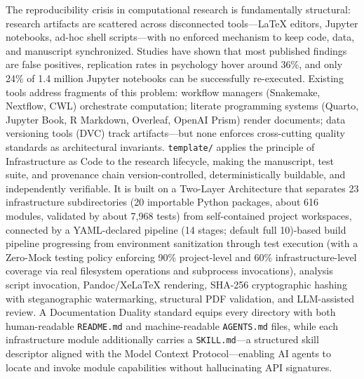 \documentclass[
]{article}
\newcounter{none} %
\begin{document}
The reproducibility crisis in computational research is fundamentally
structural: research artifacts are scattered across disconnected
tools---LaTeX editors, Jupyter notebooks, ad-hoc shell scripts---with no
enforced mechanism to keep code, data, and manuscript synchronized.
Studies have shown that most published findings are false positives,
replication rates in psychology hover around 36\%, and only 24\% of 1.4
million Jupyter notebooks can be successfully re-executed. Existing
tools address fragments of this problem: workflow managers (Snakemake,
Nextflow, CWL) orchestrate computation; literate programming systems
(Quarto, Jupyter Book, R Markdown, Overleaf, OpenAI Prism) render
documents; data versioning tools (DVC) track artifacts---but none
enforces cross-cutting quality standards as architectural invariants.
\texttt{template/} applies the principle of Infrastructure as Code to
the research lifecycle, making the manuscript, test suite, and
provenance chain version-controlled, deterministically buildable, and
independently verifiable. It is built on a Two-Layer Architecture that
separates 23 infrastructure subdirectories (20 importable Python
packages, about 616 modules, validated by about 7,968
tests) from self-contained project workspaces, connected by a
YAML-declared pipeline (14 stages; default full 10)-based build pipeline
progressing from environment sanitization through test execution (with a
Zero-Mock testing policy enforcing 90\% project-level and 60\%
infrastructure-level coverage via real filesystem operations and
subprocess invocations), analysis script invocation, Pandoc/XeLaTeX
rendering, SHA-256 cryptographic hashing with steganographic
watermarking, structural PDF validation, and LLM-assisted review. A
Documentation Duality standard equips every directory with both
human-readable \texttt{README.md} and machine-readable
\texttt{AGENTS.md} files, while each infrastructure module additionally
carries a \texttt{SKILL.md}---a structured skill descriptor aligned with
the Model Context Protocol---enabling AI agents to locate and invoke
module capabilities without hallucinating API signatures.
\end{document}
